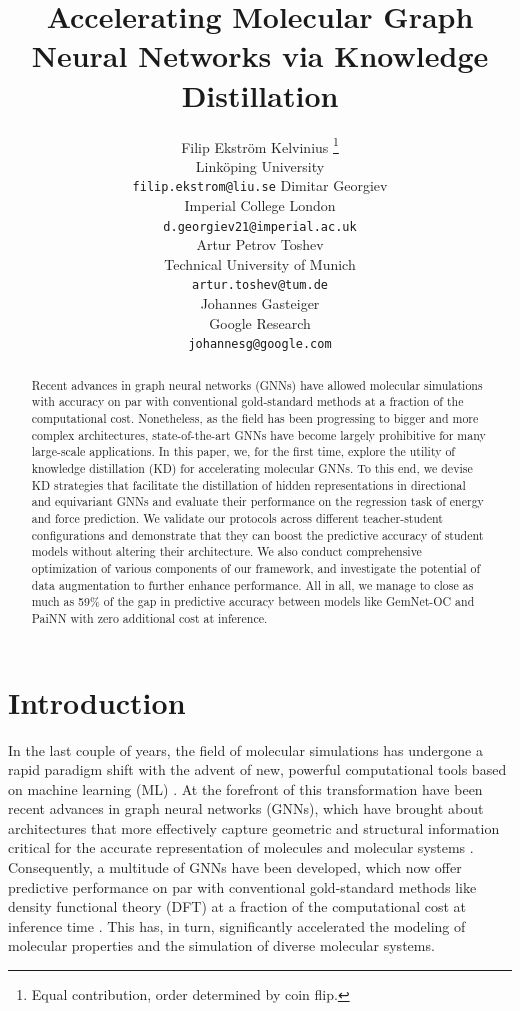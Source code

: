 \documentclass{article}
\title{Accelerating Molecular Graph Neural Networks via Knowledge Distillation}
\author{%
  Filip Ekström Kelvinius \thanks{Equal contribution, order determined by coin flip.}\\
  Linköping University \\
  \texttt{filip.ekstrom@liu.se}
  \And
  Dimitar Georgiev \footnotemark[1] \\
  Imperial College London\\
  \texttt{d.georgiev21@imperial.ac.uk} \\
  \AND
  Artur Petrov Toshev \footnotemark[1] \\
  Technical University of Munich \\
  \texttt{artur.toshev@tum.de} \\
  \And
  Johannes Gasteiger \\
  Google Research \\
  \texttt{johannesg@google.com} \\
}
\begin{document}
\maketitle


\begin{abstract}
Recent advances in graph neural networks (GNNs) have allowed molecular simulations with accuracy on par with conventional gold-standard methods at a fraction of the computational cost. Nonetheless, as the field has been progressing to bigger and more complex architectures, state-of-the-art GNNs have become largely prohibitive for many large-scale applications. In this paper, we, for the first time, explore the utility of knowledge distillation (KD) for accelerating molecular GNNs. To this end, we devise KD strategies that facilitate the distillation of hidden representations in directional and equivariant GNNs and evaluate their performance on the regression task of energy and force prediction. We validate our protocols across different teacher-student configurations and demonstrate that they can boost the predictive accuracy of student models without altering their architecture. We also conduct comprehensive optimization of various components of our framework, and investigate the potential of data augmentation to further enhance performance. All in all, we manage to close as much as 59\% of the gap in predictive accuracy between models like GemNet-OC and PaiNN with zero additional cost at inference.
\end{abstract}

\section{Introduction}
In the last couple of years, the field of molecular simulations has undergone a rapid paradigm shift with the advent of new, powerful computational tools based on machine learning (ML) \cite{noe2020machine, westermayr2021perspective}. At the forefront of this transformation have been recent advances in graph neural networks (GNNs), which have brought about architectures that more effectively capture geometric and structural information critical for the accurate representation of molecules and molecular systems \cite{reiser2022graph, wang2023graph}. Consequently, a multitude of GNNs have been developed, which now offer predictive performance on par with conventional gold-standard methods like density functional theory (DFT) at a fraction of the computational cost at inference time \cite{batzner_e3-equivariant_2022, gasteiger_directional_2020, gasteiger_gemnet_2021, musaelian_learning_2023}. This has, in turn, significantly accelerated the modeling of molecular properties and the simulation of diverse molecular systems.
\end{document}
